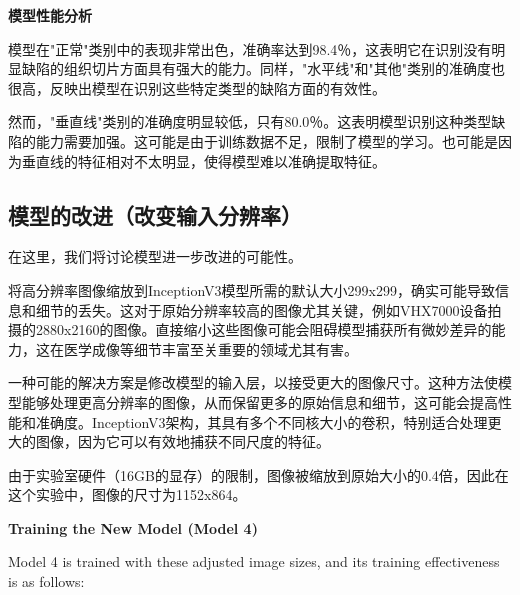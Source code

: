 \textbf{模型性能分析}

模型在"正常"类别中的表现非常出色，准确率达到98.4％，这表明它在识别没有明显缺陷的组织切片方面具有强大的能力。同样，"水平线"和"其他"类别的准确度也很高，反映出模型在识别这些特定类型的缺陷方面的有效性。

然而，"垂直线"类别的准确度明显较低，只有80.0％。这表明模型识别这种类型缺陷的能力需要加强。这可能是由于训练数据不足，限制了模型的学习。也可能是因为垂直线的特征相对不太明显，使得模型难以准确提取特征。

\subsection{模型的改进（改变输入分辨率）}

在这里，我们将讨论模型进一步改进的可能性。

将高分辨率图像缩放到InceptionV3模型所需的默认大小299x299，确实可能导致信息和细节的丢失。这对于原始分辨率较高的图像尤其关键，例如VHX7000设备拍摄的2880x2160的图像。直接缩小这些图像可能会阻碍模型捕获所有微妙差异的能力，这在医学成像等细节丰富至关重要的领域尤其有害。

一种可能的解决方案是修改模型的输入层，以接受更大的图像尺寸。这种方法使模型能够处理更高分辨率的图像，从而保留更多的原始信息和细节，这可能会提高性能和准确度。InceptionV3架构，其具有多个不同核大小的卷积，特别适合处理更大的图像，因为它可以有效地捕获不同尺度的特征。

由于实验室硬件（16GB的显存）的限制，图像被缩放到原始大小的0.4倍，因此在这个实验中，图像的尺寸为1152x864。

\textbf{Training the New Model (Model 4)}

Model 4 is trained with these adjusted image sizes, and its training effectiveness is as follows:


